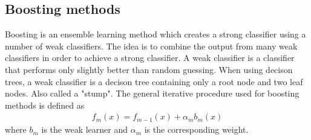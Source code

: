 \documentclass[a4paper,twocolumn]{article}
\begin{document}
\subsection{Boosting methods}
Boosting is an ensemble learning method which creates a strong classifier using a number of weak classifiers. The idea is to combine the output from many weak classifiers in order to achieve a strong classifier. A weak classifier is a classifier that performs only slightly better than random guessing\cite{hastie}. When using decison trees, a weak classifier is a decison tree containing only a root node and two leaf nodes. Also called a "stump". The general iterative procedure used for boosting methods is defined as
\begin{align}
    f_{m}(x) = f_{m-1}(x) + \alpha_{m}b_{m}(x)
\end{align}
where $b_{m}$ is the weak learner and $\alpha_{m}$ is the corresponding weight.
\end{document}
